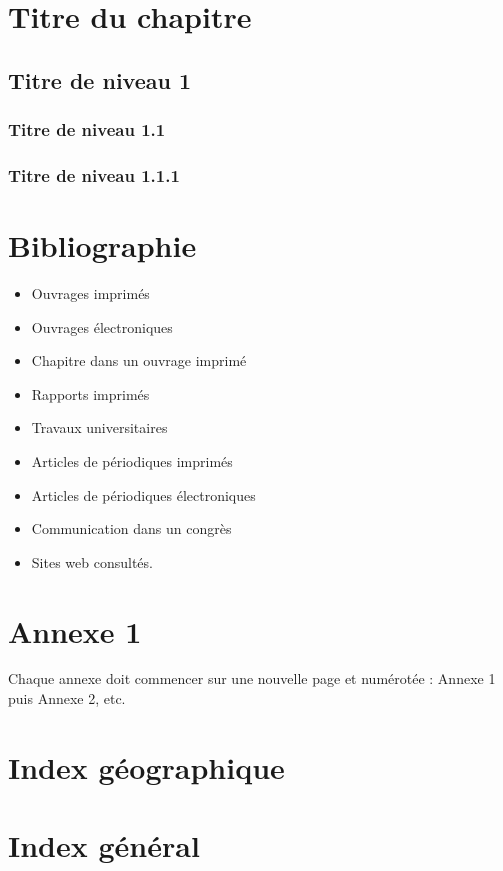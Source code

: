 \documentclass{book}
\begin{document}
\chapter{Titre du chapitre}
\blindtext
\section*{Titre de niveau 1}
\blindtext
\subsection*{Titre de niveau 1.1}
\blindtext
\subsection*{Titre de niveau 1.1.1}
\blindtext


\chapter*{Bibliographie}

\begin{itemize}
    \item Ouvrages imprimés
    \item Ouvrages électroniques 
    \item Chapitre dans un ouvrage imprimé 
    \item Rapports imprimés 
    \item Travaux universitaires 
    \item Articles de périodiques imprimés 
    \item Articles de périodiques électroniques 
    \item Communication dans un congrès 
    \item Sites web consultés.
\end{itemize}


\chapter*{Annexe 1}
Chaque annexe doit commencer sur une nouvelle page et numérotée : Annexe 1 puis Annexe 2, etc.


\chapter*{Index géographique}


\chapter*{Index général}
\end{document}
